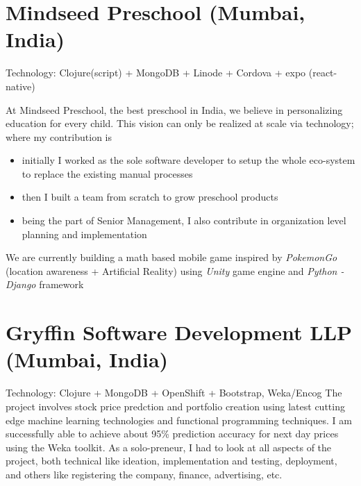 \documentclass[11pt,a4paper,sans]{moderncv} %
\begin{document}
\section{Mindseed Preschool (Mumbai, India)}
         {}{Technology: Clojure(script) + MongoDB + Linode + Cordova + expo (react-native)}
         {At Mindseed Preschool, the best preschool in India, we believe in personalizing education for every child. This vision can only be realized at scale via technology; where my contribution is
           \begin{itemize}
           \item initially I worked as the sole software developer to setup the whole eco-system to replace the existing manual processes
           \item then I built a team from scratch to grow preschool products
           \item being the part of Senior Management, I also contribute in organization level planning and implementation
           \end{itemize}
         We are currently building a math based mobile game inspired by \textit{PokemonGo} (location awareness + Artificial Reality) using \textit{Unity} game engine and \textit{Python - Django} framework}

\section{Gryffin Software Development LLP (Mumbai, India)}
         {}{Technology: Clojure + MongoDB + OpenShift + Bootstrap, Weka/Encog}
         {The project involves stock price predction and portfolio creation using latest cutting edge machine learning technologies and functional programming techniques. I am successfully able to achieve about 95\% prediction accuracy for next day prices using the Weka toolkit. As a solo-preneur, I had to look at all aspects of the project, both technical like ideation, implementation and testing, deployment, and others like registering the company, finance, advertising, etc.}

\newpage{}
\end{document}

